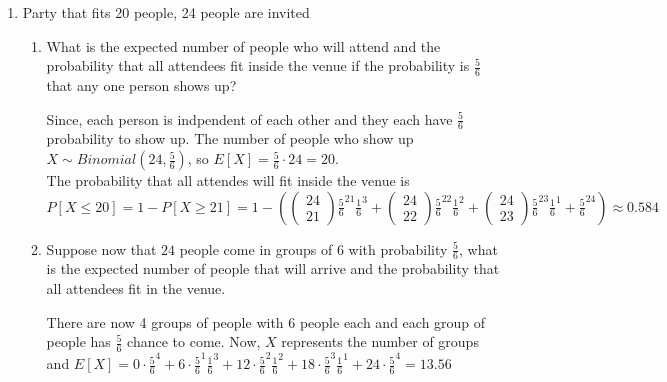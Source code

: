 \documentclass[a4paper]{article}
\begin{document}
\begin{enumerate}
\begin{proof}
      Why isn't this true???
      $P[R = r] = 
      (1000-r+1)! \cdot \frac{1}{2}^{r} \cdot \frac{1}{2}^{1000-r} = (1000-r+1)! \cdot \frac{1}{2}^{1000}$. 
    \end{proof}
  \item Party that fits 20 people, 24 people are invited
    \begin{enumerate}
      \item What is the expected number of people who will attend and the probability that all attendees fit
        inside the venue if the probability is $\frac{5}{6}$ that any one person shows up? 
        \begin{note}
          Since, each person is indpendent of each other and they each have $\frac{5}{6}$ probability to show up.
          The number of people who show up $X \sim Binomial(24, \frac{5}{6})$, so $E[X] = \frac{5}{6} \cdot 24 = 20$. \\

          The probability that all attendes will fit inside the venue is $P[X \leq 20] = 1 - P[X \geq 21] = 1 - 
          (\begin{pmatrix} 24 \\ 21 \end{pmatrix} \frac{5}{6}^{21} \frac{1}{6}^{3} +  \begin{pmatrix} 24 \\ 22 \end{pmatrix} \frac{5}{6}^{22} \frac{1}{6}^{2}
          +  \begin{pmatrix} 24 \\ 23 \end{pmatrix} \frac{5}{6}^{23} \frac{1}{6}^{1} + \frac{5}{6}^{24}) \approx 0.584$ 
        \end{note}
      \item Suppose now that $24$ people come in groups of 6 with probability $\frac{5}{6}$, what is the expected
        number of people that will arrive and the probability that all attendees fit in the venue.
        \begin{note}
          There are now 4 groups of people with 6 people each and each group of people has $\frac{5}{6}$ chance
          to come. Now, $X$ represents the number of groups and 
          $E[X] = 0 \cdot \frac{5}{6}^{4} + 6 \cdot \frac{5}{6}^{1} \frac{1}{6}^{3} + 12 \cdot \frac{5}{6}^{2} \frac{1}{6}^{2} 
          + 18 \cdot \frac{5}{6}^{3} \frac{1}{6}^{1} + 24 \cdot \frac{5}{6}^{4}= 13.56$ \\


\end{note}
\end{enumerate}
\end{enumerate}
\end{document}
